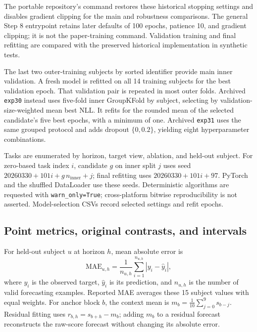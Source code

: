 \documentclass[a4paper,10pt,onecolumn]{IEEEtran}
\begin{document}
The portable repository's  command
restores these historical stopping settings and disables gradient clipping
for the main and robustness comparisons. The general Step 8 entrypoint
retains later defaults of 100 epochs, patience 10, and gradient clipping;
it is not the paper-training command. Validation training and final refitting
are compared with the preserved historical implementation in synthetic tests.

The last two outer-training subjects by sorted identifier provide main
inner validation. A fresh model is refitted on all 14 training subjects
for the best validation epoch. That validation pair is repeated in most
outer folds. Archived \texttt{exp30} instead uses five-fold inner
GroupKFold by subject, selecting by validation-size-weighted mean best NLL.
It refits for the rounded mean of the selected candidate's five best epochs,
with a minimum of one. Archived \texttt{exp31} uses the same grouped protocol
and adds dropout $\{0,0.2\}$, yielding eight hyperparameter combinations.

Tasks are enumerated by horizon, target view, ablation, and held-out subject.
For zero-based task index $i$, candidate $g$ on inner split $j$ uses seed
$20260330+101i+g\,n_{\mathrm{inner}}+j$; final refitting uses
$20260330+101i+97$. PyTorch and the shuffled DataLoader use these seeds.
Deterministic algorithms are requested with \texttt{warn\_only=True};
cross-platform bitwise reproducibility is not asserted.
Model-selection CSVs record selected settings and refit epochs.

\subsection{Point metrics, original contrasts, and intervals}

For held-out subject $u$ at horizon $h$, mean absolute error is
\begin{equation}
\mathrm{MAE}_{u,h}
=\frac{1}{n_{u,h}}\sum_{i=1}^{n_{u,h}}|y_i-\hat y_i|,
\end{equation}
where $y_i$ is the observed target, $\hat y_i$ is its prediction, and
$n_{u,h}$ is the number of valid forecasting examples.
Reported MAE averages these 15 subject values with equal weights.
For anchor block $b$, the context mean is
$m_b=\frac{1}{10}\sum_{j=0}^{9}s_{b-j}$.
Residual fitting uses $r_{b,h}=s_{b+h}-m_b$; adding $m_b$ to a residual
forecast reconstructs the raw-score forecast without changing its
absolute error.
\end{document}
